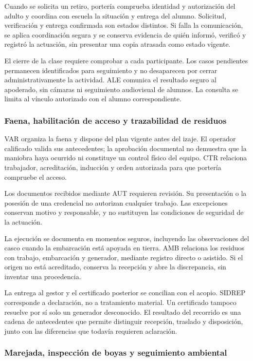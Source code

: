 Cuando se solicita un retiro, portería comprueba
identidad y autorización del adulto y coordina con
escuela la situación y entrega del alumno. Solicitud,
verificación y entrega confirmada son estados distintos.
Si falla la comunicación, se aplica coordinación segura
y se conserva evidencia de quién informó, verificó
y registró la actuación, sin presentar una copia
atrasada como estado vigente.

El cierre de la clase requiere comprobar a cada
participante. Los casos pendientes permanecen
identificados para seguimiento y no desaparecen
por cerrar administrativamente la actividad.
ALE comunica el resultado seguro al apoderado,
sin cámaras ni seguimiento audiovisual de alumnos.
La consulta se limita al vínculo autorizado con
el alumno correspondiente.

\subsubsection{Faena, habilitación de acceso y trazabilidad de residuos}

VAR organiza la faena y dispone del plan vigente
antes del izaje. El operador calificado valida
sus antecedentes; la aprobación documental no demuestra
que la maniobra haya ocurrido ni constituye un control
físico del equipo. CTR relaciona trabajador, acreditación,
inducción y orden autorizada para que portería compruebe
el acceso.

Los documentos recibidos mediante AUT requieren revisión.
Su presentación o la posesión de una credencial
no autorizan cualquier trabajo. Las excepciones
conservan motivo y responsable, y no sustituyen
las condiciones de seguridad de la actuación.

La ejecución se documenta en momentos seguros,
incluyendo las observaciones del casco cuando
la embarcación está apoyada en tierra. AMB relaciona
los residuos con trabajo, embarcación y generador,
mediante registro directo o asistido. Si el origen
no está acreditado, conserva la recepción y abre
la discrepancia, sin inventar una procedencia.

La entrega al gestor y el certificado posterior
se concilian con el acopio. SIDREP corresponde
a declaración, no a tratamiento material.
Un certificado tampoco resuelve por sí solo
un generador desconocido. El resultado del recorrido
es una cadena de antecedentes que permite distinguir
recepción, traslado y disposición, junto con
las diferencias que todavía requieren aclaración.

\subsubsection{Marejada, inspección de boyas y seguimiento ambiental}

